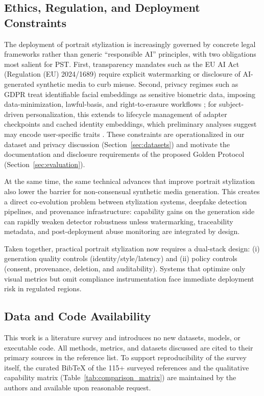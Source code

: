 \documentclass[journal]{IEEEtran}
\begin{document}
\subsection{Ethics, Regulation, and Deployment Constraints}
\label{sec:discussion:ethics_regulation}
The deployment of portrait stylization is increasingly governed by concrete legal frameworks rather than generic ``responsible AI'' principles, with two obligations most salient for PST. First, transparency mandates such as the EU AI Act (Regulation (EU) 2024/1689) \cite{euaiact2024} require explicit watermarking or disclosure of AI-generated synthetic media to curb misuse. Second, privacy regimes such as GDPR treat identifiable facial embeddings as sensitive biometric data, imposing data-minimization, lawful-basis, and right-to-erasure workflows \cite{gdpr2016}; for subject-driven personalization, this extends to lifecycle management of adapter checkpoints and cached identity embeddings, which preliminary analyses suggest may encode user-specific traits \cite{carlini2023extracting, shamshad2023clip2protect}. These constraints are operationalized in our dataset and privacy discussion (Section~\ref{sec:datasets}) and motivate the documentation and disclosure requirements of the proposed Golden Protocol (Section~\ref{sec:evaluation}).

At the same time, the same technical advances that improve portrait stylization also lower the barrier for non-consensual synthetic media generation. This creates a direct co-evolution problem between stylization systems, deepfake detection pipelines, and provenance infrastructure: capability gains on the generation side can rapidly weaken detector robustness unless watermarking, traceability metadata, and post-deployment abuse monitoring are integrated by design.

Taken together, practical portrait stylization now requires a dual-stack design: (i) generation quality controls (identity/style/latency) and (ii) policy controls (consent, provenance, deletion, and auditability). Systems that optimize only visual metrics but omit compliance instrumentation face immediate deployment risk in regulated regions.

\subsection{Data and Code Availability}
\label{sec:discussion:availability}
This work is a literature survey and introduces no new datasets, models, or executable code. All methods, metrics, and datasets discussed are cited to their primary sources in the reference list. To support reproducibility of the survey itself, the curated BibTeX of the 115+ surveyed references and the qualitative capability matrix (Table~\ref{tab:comparison_matrix}) are maintained by the authors and available upon reasonable request.
\end{document}
